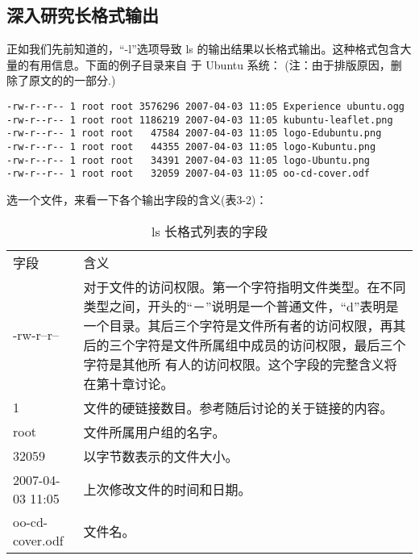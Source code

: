 \subsection{深入研究长格式输出}
正如我们先前知道的，“-l”选项导致 ls 的输出结果以长格式输出。这种格式包含大量的有用信息。下面的例子目录来自 于 Ubuntu 系统：
(注：由于排版原因，删除了原文的的一部分.)
\begin{lstlisting}
-rw-r--r-- 1 root root 3576296 2007-04-03 11:05 Experience ubuntu.ogg
-rw-r--r-- 1 root root 1186219 2007-04-03 11:05 kubuntu-leaflet.png 
-rw-r--r-- 1 root root   47584 2007-04-03 11:05 logo-Edubuntu.png 
-rw-r--r-- 1 root root   44355 2007-04-03 11:05 logo-Kubuntu.png
-rw-r--r-- 1 root root   34391 2007-04-03 11:05 logo-Ubuntu.png
-rw-r--r-- 1 root root   32059 2007-04-03 11:05 oo-cd-cover.odf
\end{lstlisting}

\par 选一个文件，来看一下各个输出字段的含义(表3-2)：

\begin{table}[ht!]
\caption{ls 长格式列表的字段}
\label{table_example}
\centering
\begin{tabular}{p{4cm}p{11cm}}
\rowcolor[gray]{0.8}
 字段 & 含义 \\

 -rw-r--r--	& 对于文件的访问权限。第一个字符指明文件类型。在不同类型之间，开头的“－”说明是一个普通文件，“d”表明是一个目录。其后三个字符是文件所有者的访问权限，再其后的三个字符是文件所属组中成员的访问权限，最后三个字符是其他所 有人的访问权限。这个字段的完整含义将在第十章讨论。\\
 \midrule
1 & 文件的硬链接数目。参考随后讨论的关于链接的内容。 \\
root & 文件所属用户组的名字。 \\
32059 & 以字节数表示的文件大小。\\
2007-04-03 11:05 & 上次修改文件的时间和日期。 \\
oo-cd-cover.odf	& 文件名。 \\
\bottomrule
\end{tabular}
\end{table}